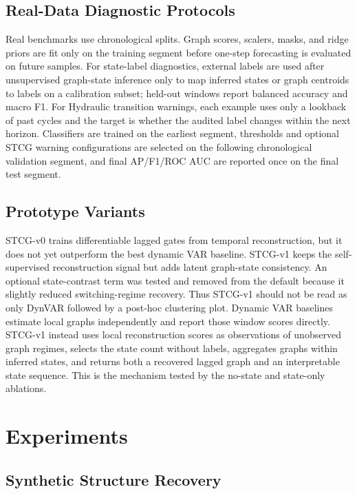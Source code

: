 \documentclass[sigconf,review,anonymous]{acmart}
\begin{document}
\subsection{Real-Data Diagnostic Protocols}

Real benchmarks use chronological splits.
Graph scores, scalers, masks, and ridge priors are fit only on the training segment before one-step forecasting is evaluated on future samples.
For state-label diagnostics, external labels are used after unsupervised graph-state inference only to map inferred states or graph centroids to labels on a calibration subset; held-out windows report balanced accuracy and macro F1.
For Hydraulic transition warnings, each example uses only a lookback of past cycles and the target is whether the audited label changes within the next horizon.
Classifiers are trained on the earliest segment, thresholds and optional STCG warning configurations are selected on the following chronological validation segment, and final AP/F1/ROC AUC are reported once on the final test segment.

\subsection{Prototype Variants}

STCG-v0 trains differentiable lagged gates from temporal reconstruction, but it does not yet outperform the best dynamic VAR baseline.
STCG-v1 keeps the self-supervised reconstruction signal but adds latent graph-state consistency.
An optional state-contrast term was tested and removed from the default because it slightly reduced switching-regime recovery.
Thus STCG-v1 should not be read as only DynVAR followed by a post-hoc clustering plot.
Dynamic VAR baselines estimate local graphs independently and report those window scores directly.
STCG-v1 instead uses local reconstruction scores as observations of unobserved graph regimes, selects the state count without labels, aggregates graphs within inferred states, and returns both a recovered lagged graph and an interpretable state sequence.
This is the mechanism tested by the no-state and state-only ablations.

\section{Experiments}

\subsection{Synthetic Structure Recovery}
\end{document}
